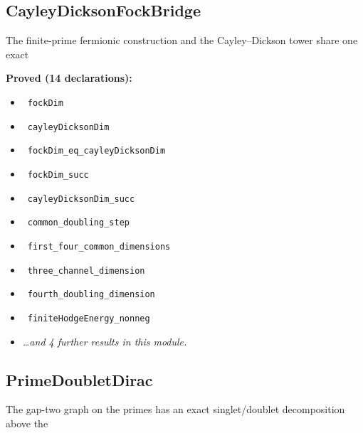 \documentclass{report}
\theoremstyle{definition}
\begin{document}
\subsection{CayleyDicksonFockBridge}
The finite-prime fermionic construction and the Cayley--Dickson tower share one exact

\noindent\textbf{Proved (14 declarations):}
\begin{itemize}
  \item {}\leanok\ \texttt{fockDim}
  \item {}\leanok\ \texttt{cayleyDicksonDim}
  \item {}\leanok\ \texttt{fockDim\_eq\_cayleyDicksonDim}
  \item {}\leanok\ \texttt{fockDim\_succ}
  \item {}\leanok\ \texttt{cayleyDicksonDim\_succ}
  \item {}\leanok\ \texttt{common\_doubling\_step}
  \item {}\leanok\ \texttt{first\_four\_common\_dimensions}
  \item {}\leanok\ \texttt{three\_channel\_dimension}
  \item {}\leanok\ \texttt{fourth\_doubling\_dimension}
  \item {}\leanok\ \texttt{finiteHodgeEnergy\_nonneg}
  \item \emph{\ldots and 4 further results in this module.}
\end{itemize}

\subsection{PrimeDoubletDirac}
The gap-two graph on the primes has an exact singlet/doublet decomposition above the
\end{document}
